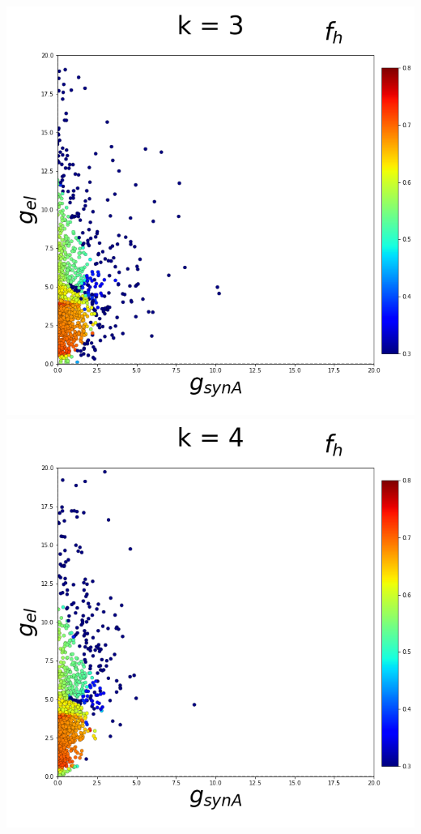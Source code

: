 \documentclass[11pt]{article}
\begin{document}
\begin{center}
\includegraphics[scale=0.125]{DSN_figs/STGCircuit_DSN_c=2_rs=3_k=3.png}
\includegraphics[scale=0.125]{DSN_figs/STGCircuit_DSN_c=2_rs=3_k=4.png}

\end{center}
\end{document}
